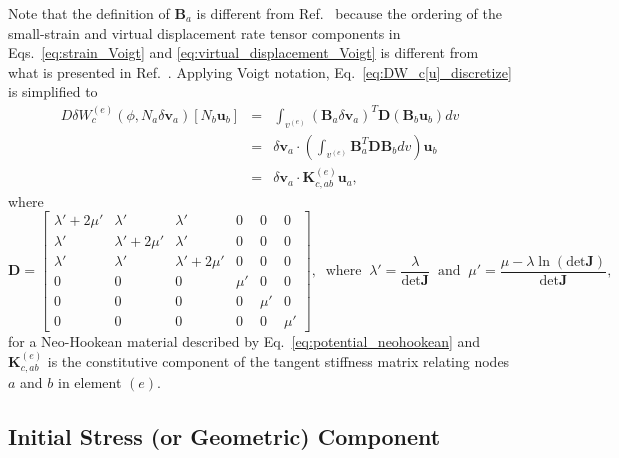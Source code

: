 %
Note that the definition of $\pmb{B}_a$ is different from Ref.\ \cite{JavierBonet:2008uxa} because the ordering of the small-strain and virtual displacement rate tensor components in Eqs.\ \eqref{eq:strain_Voigt} and \eqref{eq:virtual_displacement_Voigt} is different from what is presented in Ref.\ \cite{JavierBonet:2008uxa}. Applying Voigt notation, Eq.\ \eqref{eq:DW_c[u]_discretize} is simplified to
%
\begin{eqnarray}
D\delta W_c^{(e)}(\phi,N_a\delta \pmb{v}_a)[N_b\pmb{u}_b] &=& \int_{v^{(e)}}(\pmb{B}_a \delta \pmb{v}_a)^T \pmb{D} (\pmb{B}_b \pmb{u}_b) dv \nonumber\\
%
&=& \delta \pmb{v}_a \cdot \left(\int_{v^{(e)}} \pmb{B}_a^T \pmb{D} \pmb{B}_b  dv \right)\pmb{u}_b \nonumber\\
%
&=& \delta \pmb{v}_a \cdot \pmb{K}^{(e)}_{c,ab} \pmb{u}_a,
\end{eqnarray}
%
where
%
\begin{equation}
\pmb{D} = \begin{bmatrix}
\lambda' + 2\mu' & \lambda' & \lambda' & 0 & 0 & 0 \\
\lambda' & \lambda'+2\mu' & \lambda' & 0 & 0 & 0 \\
\lambda' & \lambda' & \lambda'+2\mu' & 0 & 0 & 0 \\
0 & 0 & 0 & \mu' & 0 & 0  \\
0 & 0 & 0 & 0 & \mu' & 0 \\
0 & 0 & 0 & 0 & 0 & \mu'  
\end{bmatrix}, \ \text{ where } \ \lambda' = \frac{\lambda}{\text{det}\pmb{J}} \ \text{ and } \ \mu' = \frac{\mu - \lambda \ln(\text{det}\pmb{J})}{\text{det}\pmb{J}},
\end{equation}
%
for a Neo-Hookean material described by Eq.\ \eqref{eq:potential_neohookean} and $\pmb{K}^{(e)}_{c,ab}$ is the constitutive component of the tangent stiffness matrix relating nodes $a$ and $b$ in element $(e)$.

\subsection{Initial Stress (or Geometric) Component}

